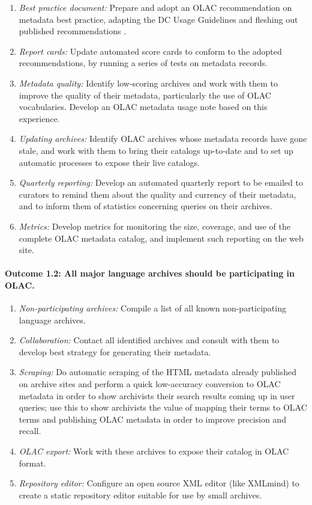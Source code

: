 \begin{enumerate}[label=\emph{\task\alph*}]\setlength{\itemsep}{0pt}
\item \emph{Best practice document:}
  Prepare and adopt an OLAC recommendation on metadata best practice,
  adapting the DC Usage Guidelines and fleshing out published recommendations
  \citep{BirdSimons03language,Simons06}.
\item \emph{Report cards:}
  Update automated score cards to conform to the adopted
  recommendations, by running a series of tests on metadata records.
\item \emph{Metadata quality:}
  Identify low-scoring archives and work with them to
  improve the quality of their metadata, particularly the
  use of OLAC vocabularies. 
  Develop an OLAC metadata usage note based on this experience.
\item \emph{Updating archives:}
  Identify OLAC archives whose metadata records have gone stale,
  and work with them to bring their catalogs up-to-date and to
  set up automatic processes to expose their live catalogs.
\item \emph{Quarterly reporting:}
  Develop an automated quarterly report to be emailed to curators to 
  remind them about the quality and currency of their metadata, and to
  inform them of statistics concerning queries on their archives.
\item \emph{Metrics:}
  Develop metrics for monitoring the size, coverage, and use of the 
  complete OLAC metadata catalog, and implement such reporting on the web site.

\end{enumerate}

\def\task{1.2}
\paragraph{Outcome {\task}: All major language archives should be participating in OLAC.}

\begin{enumerate}[label=\emph{\task\alph*}]\setlength{\itemsep}{0pt}
\item \emph{Non-participating archives:}
  Compile a list of all known non-participating language archives.
\item \emph{Collaboration:}
  Contact all identified archives and consult with them to develop best
  strategy for generating their metadata.
\item \emph{Scraping:}
  Do automatic scraping of the HTML metadata already published on
  archive sites and perform a quick low-accuracy conversion to OLAC
  metadata in order to show archivists their search results coming up
  in user queries; use this to show archivists the value of mapping their
  terms to OLAC terms and publishing OLAC metadata in order to
  improve precision and recall.
\item \emph{OLAC export:}
  Work with these archives to expose their catalog in OLAC format.
\item \emph{Repository editor:}
  Configure an open source XML editor (like XMLmind) to create a static repository editor
  suitable for use by small archives.
\end{enumerate}

